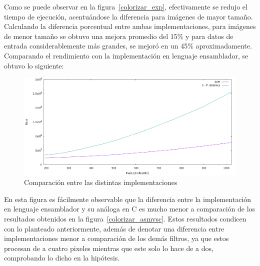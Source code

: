 \documentclass[a4paper]{article}
\begin{document}
Como se puede observar en la figura~\ref{colorizar_exp}, efectivamente se redujo el tiempo de ejecución, acentuándose la diferencia para imágenes de mayor tamaño. Calculando la diferencia porcentual entre ambas implementaciones, para imágenes de menor tamaño se obtuvo una mejora promedio del 15\% y para datos de entrada considerablemente más grandes, se mejoró en un 45\% aproximadamente.
Comparando el rendimiento con la implementación en lenguaje ensamblador, se obtuvo lo siguiente:
\\
\begin{figure}[H]
  \begin{center}
	\includegraphics[scale=0.66]{imagenes/colorizarExpASM.png}
	\caption{Comparación entre las distintas implementaciones}
	\label{colorizar_expASM}
  \end{center}
\end{figure}

En esta figura es fácilmente observable que la diferencia entre la implementación en lenguaje ensamblador y su análoga en C es mucho menor a comparación de los resultados obtenidos en la figura~\ref{colorizar_asmvsc}. Estos resultados condicen con lo planteado anteriormente, además de denotar una diferencia entre implementaciones menor a comparación de los demás filtros, ya que estos procesan de a cuatro pixeles mientras que este solo lo hace de a dos, comprobando lo dicho en la hipótesis. 
\end{document}
